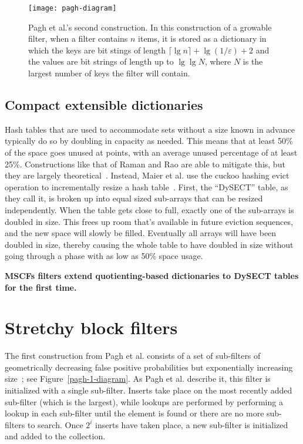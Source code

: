 \documentclass[letterpaper,twocolumn,10pt]{article}
\newcommand{\etal}{et al.}
\newcommand{\Taffy}{Stretchy}
\newcommand{\MTCF}{MSCF}
\newcommand{\Taffy}{Taffy}
\newcommand{\MTCF}{MTCF}
\begin{document}
\begin{figure}[b!]
\texttt{[image: pagh-diagram]}
\caption{\label{pagh-diagram}
Pagh \etal{}'s second construction.
In this construction of a growable filter, when a filter contains $n$ items, it is stored as a dictionary in which the keys are bit stings of length $\lceil \lg n \rceil + \lg (1/\varepsilon) + 2$ and the values are bit strings of length up to $\lg \lg N$, where $N$ is the largest number of keys the filter will contain.
}
\end{figure}



\subsection{Compact extensible dictionaries}

Hash tables that are used to accommodate sets without a size known in advance typically do so by doubling in capacity as needed.
This means that at least 50\% of the space goes unused at points, with an average unused percentage of at least 25\%.
Constructions like that of Raman and Rao are able to mitigate this, but they are largely theoretical~\cite{succinct}.
Instead, Maier \etal{} use the cuckoo hashing evict operation to incrementally resize a hash table~\cite{dysect}.
First, the ``DySECT'' table, as they call it, is broken up into equal sized sub-arrays that can be resized independently.
When the table gets close to full, exactly one of the sub-arrays is doubled in size.
This frees up room that's available in future eviction sequences, and the new space will slowly be filled.
Eventually all arrays will have been doubled in size, thereby causing the whole table to have doubled in size without going through a phase with as low as 50\% space usage.

{\bf \MTCF{}s filters extend quotienting-based dictionaries to DySECT tables for the first time.}

\section{\Taffy{} block filters}
\label{tbf}

The first construction from Pagh \etal{} consists of a set of sub-filters of geometrically decreasing false positive probabilities but exponentially increasing size~\cite{psw}; see Figure~\ref{pagh-1-diagram}.
As Pagh \etal{} describe it, this filter is initialized with a single sub-filter.
Inserts take place on the most recently added sub-filter (which is the largest), while lookups are performed by performing a lookup in each sub-filter until the element is found or there are no more sub-filters to search.
Once $2^i$ inserts have taken place, a new sub-filter is initialized and added to the collection.
\end{document}
